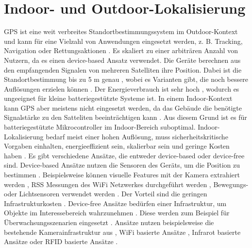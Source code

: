 \section{Indoor- und Outdoor-Lokalisierung}
GPS ist eine weit verbreites Standortbestimmungssystem im Outdoor-Kontext  und kann für eine Vielzahl von Anwendungen eingesetzt werden,
z. B. Tracking, Navigation oder Rettungsaktionen \cite{kaplan2005understanding}.
Es skaliert zu einer arbiträren Anzahl von Nutzern, da es einen device-based Ansatz verwendet.
Die Geräte berechnen aus den empfangenden Signalen von mehreren Satelliten ihre Position.
Dabei ist die Standortbestimmung bis zu 5 m genau \cite{sadowski2018rssi},
wobei es Varianten gibt, die noch bessere Auflösungen erzielen können \cite{parkinson1996differential}.
Der Energieverbrauch ist sehr hoch \cite{jurdak2013energy}, wodurch es ungeeignet für kleine batteriegestützte Systeme ist.
In einem Indoor-Kontext kann GPS aber meistens nicht eingesetzt werden,
da das Gebäude die benötigte Signalstärke zu den Satteliten beeinträchtigen kann \cite{xiao2016survey, jin2006indoor}.
Aus diesem Grund ist es für batteriegestützte Mikrocontroller im Indoor-Bereich suboptimal.
\newline
\newline
Indoor-Lokalisierung bedarf meist einer hohen Auflösung, muss sicherheitskritische Vorgaben einhalten,
energieeffizient sein, skalierbar sein und geringe Kosten haben \cite{xiao2016survey}.
Es gibt verschiedene Ansätze, die entweder device-based oder device-free sind.
\newline
\newline
Device-based Ansätze nutzen die Sensoren des Geräts, um die Position zu bestimmen \cite{xiao2016survey}.
Beispielsweise können visuelle Features mit der Kamera extrahiert werden \cite{poulose2019hybrid, cunha2011using},
RSS Messungen des WiFi Netzwerkes durchgeführt werden \cite{pan2008transfer},
Bewegungs- oder Lichtsensoren verwendet werden \cite{poulose2019hybrid, wang2018deepml, xiao2016survey}.
Der Vorteil sind die geringen Infrastrukturkosten \cite{xiao2016survey}.
\newline
\newline
Device-free Ansätze bedürfen einer Infrastruktur, um Objekte im Interessebereich wahrzunehmen \cite{xiao2016survey}.
Diese werden zum Beispiel für Überwachsungsszenarien eingesetzt \cite{qian2018widar2}.
Ansätze nutzen beispielsweise die bestehende Kamerainfrastruktur aus \cite{kim2019info},
WiFi basierte Ansätze \cite{qian2018widar2}, Infrarot basierte Ansätze \cite{kemper2010passive}
oder RFID basierte Ansätze \cite{yang2015see}.